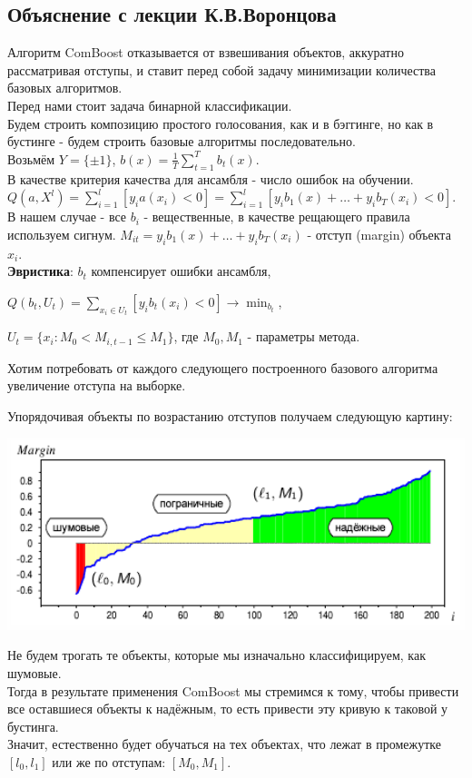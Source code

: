 \subsection{Объяснение с лекции К.В.Воронцова}
Алгоритм ComBoost отказывается от взвешивания объектов, аккуратно рассматривая отступы, и ставит перед собой задачу минимизации количества базовых алгоритмов. \\
Перед нами стоит задача бинарной классификации. \\
Будем строить композицию простого голосования, как и в бэггинге, но как в бустинге - будем строить базовые алгоритмы последовательно. \\
Возьмём $Y = \{\pm1\}$, $b(x) = \frac{1}{T}\sum_{t=1}^{T}b_t(x)$.\\
В качестве критерия качества для ансамбля - число ошибок на обучении.\\
$Q(a,X^l) = \sum_{i=1}^{l}[y_ia(x_i) < 0] = \sum_{i=1}^{l}[y_ib_1(x) + \dots + y_ib_T(x_i) < 0]$. \\
В нашем случае - все $b_i$ - вещественные, в качестве рещающего правила используем сигнум.
$M_{it} = y_ib_1(x) + \dots + y_ib_T(x_i)$ - отступ (margin) объекта $x_i$. \\
\textbf{Эвристика}: $b_t$ компенсирует ошибки ансамбля, \\
\begin{center}
     $Q(b_t, U_t) = \sum_{x_i \in U_t}[y_ib_t(x_i) < 0] \rightarrow \min_{b_t}$,
\end{center}
$U_t = \{x_i : M_0 < M_{i,t-1} \leq M_1\}$, где $M_0, M_1$ - параметры метода. 
    
Хотим потребовать от каждого следующего построенного базового алгоритма увеличение отступа на выборке. 
    
Упорядочивая объекты по возрастанию отступов получаем следующую картину:
    
\includegraphics[width=15cm]{images/item_classes.png}

Не будем трогать те объекты, которые мы изначально классифицируем, как шумовые. \\
Тогда в результате применения ComBoost мы стремимся к тому, чтобы привести все оставшиеся объекты к надёжным, то есть привести эту кривую к таковой у бустинга. \\
Значит, естественно будет обучаться на тех объектах, что лежат в промежутке $[l_0, l_1]$ или же по отступам: $[M_0, M_1]$. \\
    
